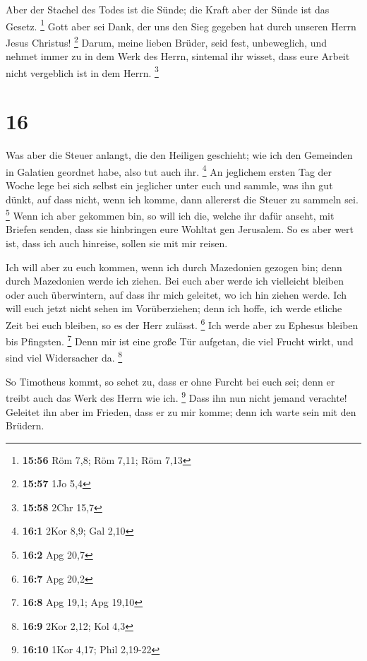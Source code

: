  Aber der Stachel des Todes ist die Sünde; die Kraft aber
der Sünde ist das Gesetz. \footnote{\textbf{15:56} Röm 7,8; Röm 7,11;
  Röm 7,13}  Gott aber sei Dank, der uns den Sieg gegeben
hat durch unseren Herrn Jesus Christus! \footnote{\textbf{15:57} 1Jo 5,4}
 Darum, meine lieben Brüder, seid fest, unbeweglich, und
nehmet immer zu in dem Werk des Herrn, sintemal ihr wisset, dass eure
Arbeit nicht vergeblich ist in dem Herrn. \footnote{\textbf{15:58} 2Chr
  15,7}

\hypertarget{section-10}{%
\section{16}\label{section-10}}

 Was aber die Steuer anlangt, die den Heiligen geschieht;
wie ich den Gemeinden in Galatien geordnet habe, also tut auch ihr.
\footnote{\textbf{16:1} 2Kor 8,9; Gal 2,10}  An jeglichem
ersten Tag der Woche lege bei sich selbst ein jeglicher unter euch und
sammle, was ihn gut dünkt, auf dass nicht, wenn ich komme, dann
allererst die Steuer zu sammeln sei. \footnote{\textbf{16:2} Apg 20,7}
 Wenn ich aber gekommen bin, so will ich die, welche ihr
dafür anseht, mit Briefen senden, dass sie hinbringen eure Wohltat gen
Jerusalem.  So es aber wert ist, dass ich auch hinreise,
sollen sie mit mir reisen.

 Ich will aber zu euch kommen, wenn ich durch Mazedonien
gezogen bin; denn durch Mazedonien werde ich ziehen.  Bei
euch aber werde ich vielleicht bleiben oder auch überwintern, auf dass
ihr mich geleitet, wo ich hin ziehen werde.  Ich will euch
jetzt nicht sehen im Vorüberziehen; denn ich hoffe, ich werde etliche
Zeit bei euch bleiben, so es der Herr zulässt. \footnote{\textbf{16:7}
  Apg 20,2}  Ich werde aber zu Ephesus bleiben bis
Pfingsten. \footnote{\textbf{16:8} Apg 19,1; Apg 19,10} 
Denn mir ist eine große Tür aufgetan, die viel Frucht wirkt, und sind
viel Widersacher da. \footnote{\textbf{16:9} 2Kor 2,12; Kol 4,3}

 So Timotheus kommt, so sehet zu, dass er ohne Furcht bei
euch sei; denn er treibt auch das Werk des Herrn wie ich. \footnote{\textbf{16:10}
  1Kor 4,17; Phil 2,19-22}  Dass ihn nun nicht jemand
verachte! Geleitet ihn aber im Frieden, dass er zu mir komme; denn ich
warte sein mit den Brüdern.

